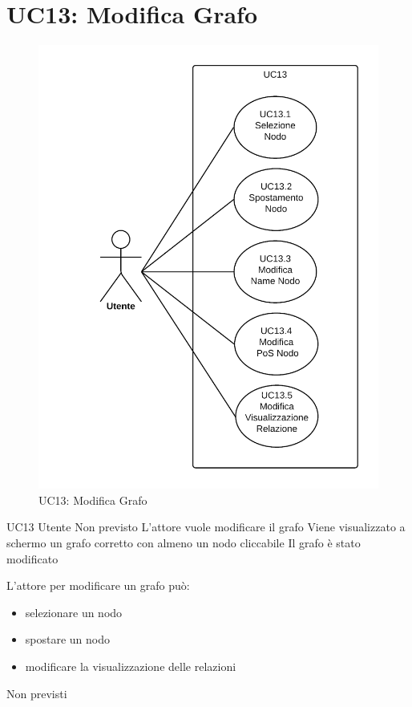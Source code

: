 \documentclass[../AnalisideiRequisiti.tex]{subfiles}
\begin{document}
\section{UC13: Modifica Grafo}
\begin{figure}[H]
	\centering
	\includegraphics[width=\textwidth]{../img/UC13.png}
	\caption{UC13: Modifica Grafo}
\end{figure}
\UserCase
{UC13}
{Utente}
{Non previsto}
{L'attore vuole modificare il grafo}
{Viene visualizzato a schermo un grafo corretto con almeno un nodo cliccabile }
{Il grafo è stato modificato}
{
	L'attore per modificare un grafo può:
	\begin{itemize}
		\item{} selezionare un nodo 
		\item{} spostare un nodo 	
		\item{} modificare la visualizzazione delle relazioni 		
	\end{itemize}
}
{Non previsti}
\end{document}
